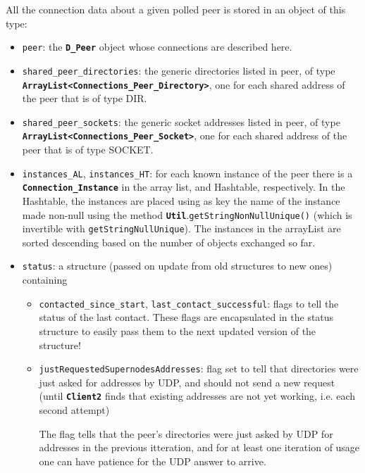 \documentclass{book}
\newcommand{\cls}[1]{{\tt\bf #1}}
\newcommand{\mth}[1]{{\tt #1}}
\newcommand{\mmb}[1]{{\tt #1}}
\begin{document}
All the connection data about a given polled peer is stored in an object of this type:
\begin{itemize}
\item
\mmb{peer}: the \cls{D\_Peer} object whose connections are described here.
\item
\mmb{shared\_peer\_directories}: the generic directories listed in peer, of type \cls{ArrayList<Connections\_Peer\_Directory>}, one for each
shared address of the peer that is of type DIR.
\item
\mmb{shared\_peer\_sockets}: the generic socket addresses listed in peer, of type \cls{ArrayList<Connections\_Peer\_Socket>}, one for each
shared address of the peer that is of type SOCKET.
\item
\mmb{instances\_AL}, \mmb{instances\_HT}: for each known instance of the peer there is a \cls{Connection\_Instance}
in the array list, and Hashtable, respectively. In the Hashtable, the instances are placed using as key the name
of the instance made non-null using the method \cls{Util}.\mth{getStringNonNullUnique()} (which is invertible with \mth{getStringNullUnique}).
The instances in the arrayList are sorted descending based on the number of objects exchanged so far.
\item
\mmb{status}: a structure (passed on update from old structures to new ones)  containing
 \begin{itemize}
 \item
  \mmb{contacted\_since\_start}, \mmb{last\_contact\_successful}: flags to tell the status of the last contact. These flags are encapsulated in the
status structure to easily pass them to the next updated version of the structure!
 \item
 \mmb{justRequestedSupernodesAddresses}: flag set to tell that directories were just asked for addresses by UDP, and should not
 send a new request (until \cls{Client2} finds that existing addresses are not yet working, i.e. each second attempt)

 The flag tells that the peer's directories were just asked by UDP for addresses in the previous itteration, and for at least one iteration of usage one can have patience for the UDP answer to arrive.
 \end{itemize}
\end{itemize}
\end{document}
